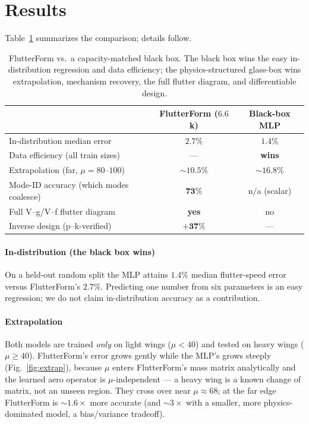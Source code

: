 \documentclass{article}
\begin{document}
\section{Results}\label{sec:res}
Table~\ref{tab:summary} summarizes the comparison; details follow.

\begin{table}[t]
\centering\small
\begin{tabular}{lcc}
\toprule
& \textbf{FlutterForm} ($6.6$k) & Black-box MLP \\
\midrule
In-distribution median error & $2.7\%$ & $\mathbf{1.4\%}$ \\
Data efficiency (all train sizes) & --- & \textbf{wins} \\
Extrapolation (far, $\mu{=}80\text{--}100$) & $\mathbf{\sim\!10.5\%}$ & $\sim\!16.8\%$ \\
Mode-ID accuracy (which modes coalesce) & $\mathbf{73\%}$ & n/a (scalar) \\
Full V--g/V--f flutter diagram & \textbf{yes} & no \\
Inverse design (p--k-verified) & $\mathbf{+37\%}$ & --- \\
\bottomrule
\end{tabular}
\caption{FlutterForm vs.\ a capacity-matched black box. The black box wins the
easy in-distribution regression and data efficiency; the physics-structured
glass-box wins extrapolation, mechanism recovery, the full flutter diagram, and
differentiable design.}
\label{tab:summary}
\end{table}

\paragraph{In-distribution (the black box wins)} On a held-out random split the
MLP attains $1.4\%$ median flutter-speed error versus FlutterForm's $2.7\%$.
Predicting one number from six parameters is an easy regression; we do not claim
in-distribution accuracy as a contribution.

\paragraph{Extrapolation} Both models are trained \emph{only} on
light wings ($\mu<40$) and tested on heavy wings ($\mu\ge40$). FlutterForm's error
grows gently while the MLP's grows steeply (Fig.~\ref{fig:extrap}), because $\mu$
enters FlutterForm's mass matrix analytically and the learned aero operator is
$\mu$-independent --- a heavy wing is a known change of matrix, not an unseen
region. They cross over near $\mu\!\approx\!68$; at the far edge FlutterForm is
$\sim\!1.6\times$ more accurate (and $\sim\!3\times$ with a smaller,
more physics-dominated model, a bias/variance tradeoff).
\end{document}
